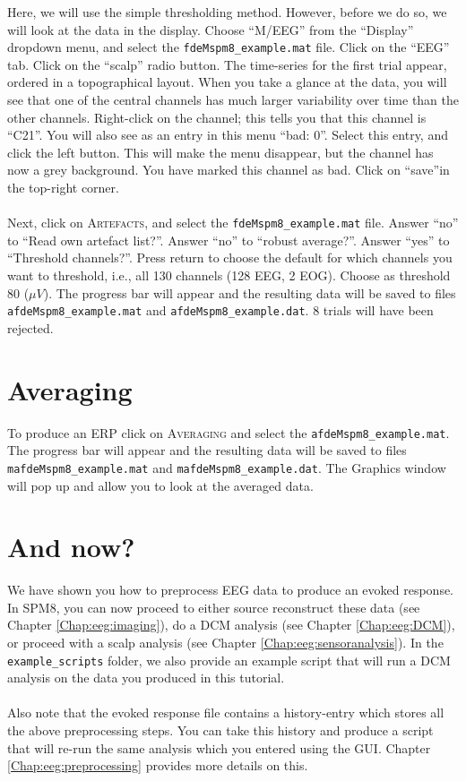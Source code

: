 Here, we will use the simple thresholding method. However, before we do so, we will look at the data in the display. Choose ``M/EEG'' from the ``Display'' dropdown menu, and select the \texttt{fdeMspm8\_example.mat} file. Click on the ``EEG'' tab. Click on the ``scalp'' radio button. The time-series for the first trial appear, ordered in a topographical layout. When you take a glance at the data, you will see that one of the central channels has much larger variability over time than the other channels. Right-click on the channel; this tells you that this channel is ``C21''. You will also see as an entry in this menu ``bad: 0''. Select this entry, and click the left button. This will make the menu disappear, but the channel has now a grey background. You have marked this channel as bad. Click on ``save''in the top-right corner.
\\
\\
Next, click on \textsc{Artefacts}, and select the \texttt{fdeMspm8\_example.mat} file. Answer ``no'' to ``Read own artefact list?''. Answer ``no'' to ``robust average?''. Answer ``yes'' to ``Threshold channels?''. Press return to choose the default for which channels you want to threshold, i.e., all 130 channels (128 EEG, 2 EOG). Choose as threshold 80 ($\mu V$). The progress bar will appear and the resulting data will be saved to files \texttt{afdeMspm8\_example.mat} and \texttt{afdeMspm8\_example.dat}. 8 trials will have been rejected.

\section{Averaging}
To produce an ERP click on \textsc{Averaging} and select the \texttt{afdeMspm8\_example.mat}. The progress bar will appear and the resulting data will be saved to files \texttt{mafdeMspm8\_example.mat} and \texttt{mafdeMspm8\_example.dat}. The Graphics window will pop up and allow you to look at the averaged data.

\section{And now?}
We have shown you how to preprocess EEG data to produce an evoked response. In SPM8, you can now proceed to either source reconstruct these data (see Chapter \ref{Chap:eeg:imaging}), do a DCM analysis (see Chapter \ref{Chap:eeg:DCM}), or proceed with a scalp analysis (see Chapter \ref{Chap:eeg:sensoranalysis}). In the \texttt{example\_scripts} folder, we also provide an example script that will run a DCM analysis on the data you produced in this tutorial.
\\
\\
Also note that the evoked response file contains a history-entry which stores all the above preprocessing steps. You can take this history and produce a script that will re-run the same analysis which you entered using the GUI. Chapter \ref{Chap:eeg:preprocessing} provides more details on this.
